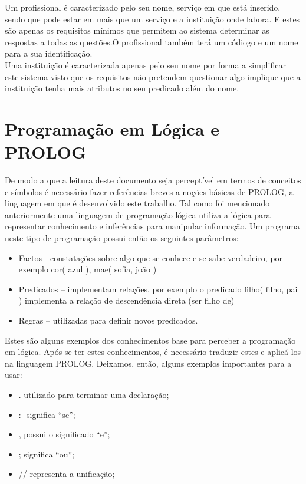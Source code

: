Um profissional é caracterizado pelo seu nome, serviço em que está inserido, sendo que pode estar em mais que um serviço e a instituição onde labora. E estes são apenas os requisitos mínimos que permitem ao sistema determinar as respostas a todas as questões.O profissional também terá um códiogo e um nome para a sua identificação. 
\\

Uma instituição é caracterizada apenas pelo seu nome por forma a simplificar este sistema visto que os requisitos não pretendem questionar algo implique que a instituição tenha mais atributos no seu predicado além do nome.


\section{Programação em Lógica e PROLOG}
\label{p2:proglogprolog}
De modo a que a leitura deste documento seja perceptível em termos de conceitos e símbolos é necessário fazer referências breves a noções básicas de PROLOG, a linguagem em que é desenvolvido este trabalho.
Tal como foi mencionado anteriormente uma linguagem de programação lógica utiliza a lógica para representar conhecimento e inferências para manipular informação. Um programa neste tipo de programação possui então os seguintes parâmetros:

\begin{itemize}
	\item Factos - constatações sobre algo que se conhece e se sabe verdadeiro, por exemplo cor( azul ), mae( sofia, joão )
	\item Predicados – implementam relações, por exemplo o predicado filho( filho, pai ) implementa a relação de descendência direta (ser filho de)
	\item Regras – utilizadas para definir novos predicados. 
\end{itemize}

Estes são alguns exemplos dos conhecimentos base para perceber a programação em lógica.
Após se ter estes conhecimentos, é necessário traduzir estes e aplicá-los na linguagem PROLOG.
Deixamos, então, alguns exemplos importantes para a usar:

\begin{itemize}
	\item .  utilizado para terminar uma declaração;
	\item :-  significa “se”;
	\item ,  possui o significado “e”;
	\item ;  significa “ou”;
	\item //  representa a unificação;
\end{itemize}

